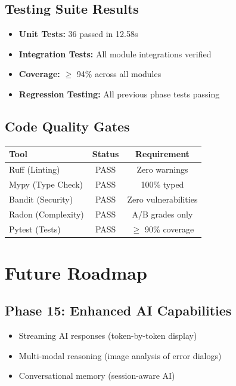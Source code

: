 \documentclass[11pt,a4paper]{article}
\begin{document}
\subsection{Testing Suite Results}

\begin{tcolorbox}[colback=green!5!white,colframe=green!70!black,title=Current Test Status]
\begin{itemize}
    \item \textbf{Unit Tests:} 36 passed in 12.58s
    \item \textbf{Integration Tests:} All module integrations verified
    \item \textbf{Coverage:} $\geq$ 94\% across all modules
    \item \textbf{Regression Testing:} All previous phase tests passing
\end{itemize}
\end{tcolorbox}

\subsection{Code Quality Gates}

\begin{table}[h]
\centering
\begin{tabular}{lcc}
\toprule
\textbf{Tool} & \textbf{Status} & \textbf{Requirement} \\
\midrule
Ruff (Linting) & PASS & Zero warnings \\
Mypy (Type Check) & PASS & 100\% typed \\
Bandit (Security) & PASS & Zero vulnerabilities \\
Radon (Complexity) & PASS & A/B grades only \\
Pytest (Tests) & PASS & $\geq$ 90\% coverage \\
\bottomrule
\end{tabular}
\end{table}

\section{Future Roadmap}

\subsection{Phase 15: Enhanced AI Capabilities}
\begin{itemize}
    \item Streaming AI responses (token-by-token display)
    \item Multi-modal reasoning (image analysis of error dialogs)
    \item Conversational memory (session-aware AI)
\end{itemize}
\end{document}
